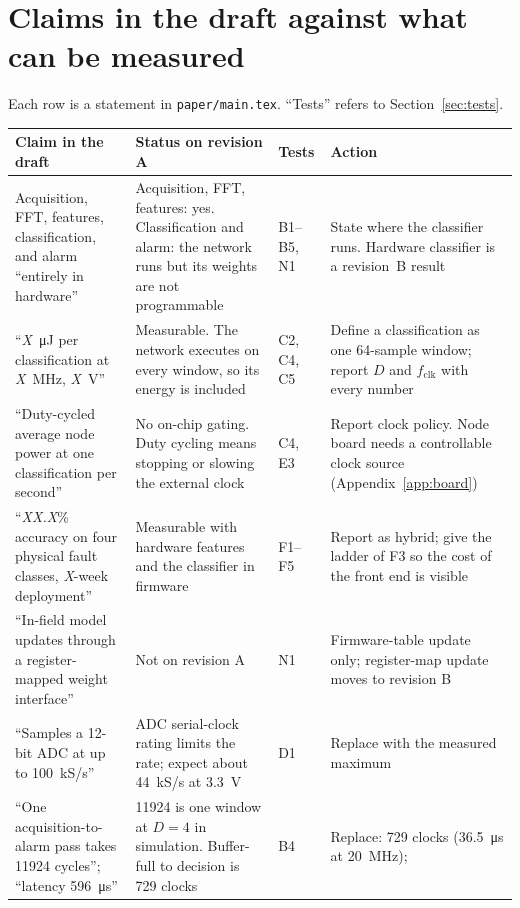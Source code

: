 \documentclass[10pt]{article}
\begin{document}
\section{Claims in the draft against what can be measured}
\label{sec:claims}
Each row is a statement in \texttt{paper/main.tex}. ``Tests'' refers to
Section~\ref{sec:tests}.

{\small
\begin{longtable}{@{}L{4.5cm}L{4.3cm}L{1.6cm}L{4.6cm}@{}}
\toprule
Claim in the draft & Status on revision A & Tests & Action\\
\midrule
\endhead
Acquisition, FFT, features, classification, and alarm ``entirely in
hardware'' & Acquisition, FFT, features: yes. Classification and alarm:
the network runs but its weights are not programmable & B1--B5, N1 &
State where the classifier runs. Hardware classifier is a revision~B
result\\\addlinespace[2pt]
``\textit{X}~\si{\micro\joule} per classification at \textit{X}~MHz,
\textit{X}~V'' & Measurable. The network executes on every window, so its
energy is included & C2, C4, C5 & Define a classification as one
64-sample window; report $D$ and $f_{\mathrm{clk}}$ with every number\\\addlinespace[2pt]
``Duty-cycled average node power at one classification per second'' &
No on-chip gating. Duty cycling means stopping or slowing the external
clock & C4, E3 & Report clock policy. Node board needs a controllable
clock source (Appendix~\ref{app:board})\\\addlinespace[2pt]
``\textit{XX.X}\% accuracy on four physical fault classes,
\textit{X}-week deployment'' & Measurable with hardware features and the
classifier in firmware & F1--F5 & Report as hybrid; give the ladder of
F3 so the cost of the front end is visible\\\addlinespace[2pt]
``In-field model updates through a register-mapped weight interface'' &
Not on revision A & N1 & Firmware-table update only; register-map update
moves to revision B\\\addlinespace[2pt]
``Samples a 12-bit ADC at up to \SI{100}{kS/s}'' & ADC serial-clock
rating limits the rate; expect about \SI{44}{kS/s} at \SI{3.3}{\volt} &
D1 & Replace with the measured maximum\\\addlinespace[2pt]
``One acquisition-to-alarm pass takes \num{11924} cycles'';
``latency \SI{596}{\micro\second}'' & \num{11924} is one window at
$D=4$ in simulation. Buffer-full to decision is 729 clocks & B4 &
Replace: 729 clocks (\SI{36.5}{\micro\second} at \SI{20}{\mega\hertz});

\end{longtable}}
\end{document}

